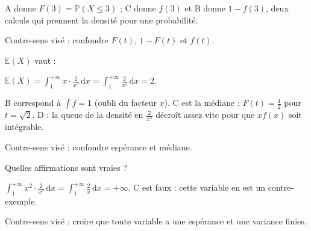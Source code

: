 {\begin{question}
\begin{explanations}
A donne $F(3) = \mathbb{P}(X \leq 3)$ ; C donne $f(3)$ et B donne $1 - f(3)$,
deux calculs qui prennent la densité pour une probabilité.

Contre-sens visé : confondre $F(t)$, $1 - F(t)$ et $f(t)$.
\end{explanations}
\end{question}

\begin{question}
$\mathbb{E}(X)$ vaut :
\begin{answers}
\end{answers}
\begin{explanations}
$\mathbb{E}(X) = \int_1^{+\infty} x\cdot\frac{2}{x^3}\,\mathrm{d}x = \int_1^{+\infty}\frac{2}{x^2}\,\mathrm{d}x = 2$.

B correspond à $\int f = 1$ (oubli du facteur $x$). C est la médiane :
$F(t) = \frac12$ pour $t = \sqrt2$. D : la queue de la densité en
$\frac{2}{x^3}$ décroît assez vite pour que $x f(x)$ soit intégrable.

Contre-sens visé : confondre espérance et médiane.
\end{explanations}
\end{question}

\begin{question}
Quelles affirmations sont vraies ?
\begin{answers}
\end{answers}
\begin{explanations}
$\int_1^{+\infty} x^2\cdot\frac{2}{x^3}\,\mathrm{d}x = \int_1^{+\infty}\frac{2}{x}\,\mathrm{d}x = +\infty$.
C est faux : cette variable en est un contre-exemple.

Contre-sens visé : croire que toute variable a une espérance et une variance finies.
\end{explanations}
\end{question}
}
